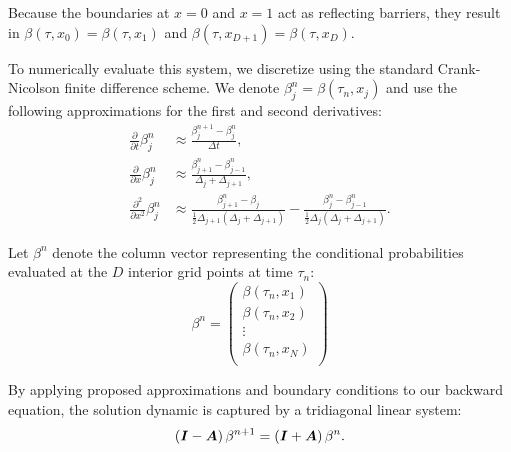 \documentclass{article}
\def\A{\mbox{\boldmath $A$}}
\def\I{\mbox{\boldmath $I$}}
\begin{document}
Because the boundaries at $ x=0 $ and $ x=1 $ act as reflecting barriers, they result in $\beta(\tau, x_0) = \beta(\tau, x_1)$ and $ \beta(\tau, x_{D+1}) = \beta(\tau, x_D) $.

To numerically evaluate this system, we discretize using the standard Crank-Nicolson finite difference scheme.
We denote $\beta_j^n = \beta(\tau_n, x_j)$ and use the following approximations for the first and second derivatives:
$$
\begin{aligned}
    \frac{\partial}{\partial t}  \beta_{j}^{n}  &\approx \frac{\beta_{j}^{n+1} - \beta_{j}^{n}}{\Delta t}, \label{eq:derivativeT} \\
    \frac{\partial}{\partial x} \beta_{j}^{n} &\approx \frac{\beta_{j+1}^{n} - \beta_{j-1}^{n}}{\Delta_j + \Delta_{j+1}}, \\
    \frac{\partial^2}{\partial x^2} \beta_{j}^{n} &\approx \frac{\beta_{j+1}^{n} - \beta_j}{\frac{1}{2}\Delta_{j+1}(\Delta_j + \Delta_{j+1})} - \frac{\beta_{j}^{n} - \beta_{j-1}^{n}}{\frac{1}{2}\Delta_j(\Delta_j + \Delta_{j+1})}.
\end{aligned}
$$

\bigskip

Let $ \beta^n $ denote the column vector representing the conditional probabilities evaluated at the $ D $ interior grid points at time $ \tau_n $:
\begin{equation*}
    \beta^{n} =
    \begin{pmatrix}
        \beta(\tau_n, x_1)\\
        \beta(\tau_n, x_2)\\
        \vdots \\
        \beta(\tau_n, x_N)\\
    \end{pmatrix}	
\end{equation*}

By applying proposed approximations and boundary conditions to our backward equation, the solution dynamic is captured by a tridiagonal linear system:
$$
\left(\I - \A \right) \beta^{n+1} = \left(\I + \A \right)\beta^n.
$$
\end{document}
